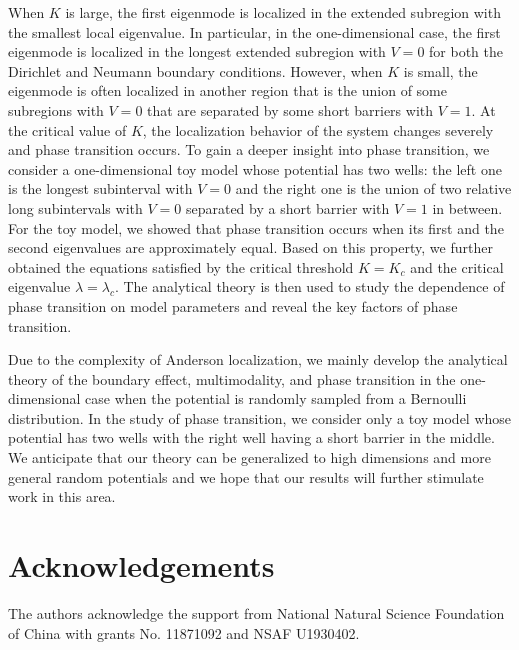 \documentclass[a4paper,11pt]{article}
\begin{document}
When $K$ is large, the first eigenmode is localized in the extended subregion with the smallest local eigenvalue. In particular, in the one-dimensional case, the first eigenmode is localized in the longest extended subregion with $V = 0$ for both the Dirichlet and Neumann boundary conditions. However, when $K$ is small, the eigenmode is often localized in another region that is the union of some subregions with $V = 0$ that are separated by some short barriers with $V = 1$. At the critical value of $K$, the localization behavior of the system changes severely and phase transition occurs. To gain a deeper insight into phase transition, we consider a one-dimensional toy model whose potential has two wells: the left one is the longest subinterval with $V = 0$ and the right one is the union of two relative long subintervals with $V = 0$ separated by a short barrier with $V = 1$ in between. For the toy model, we showed that phase transition occurs when its first and the second eigenvalues are approximately equal. Based on this property, we further obtained the equations satisfied by the critical threshold $K = K_c$ and the critical eigenvalue $\lambda = \lambda_c$. The analytical theory is then used to study the dependence of phase transition on model parameters and reveal the key factors of phase transition.

Due to the complexity of Anderson localization, we mainly develop the analytical theory of the boundary effect, multimodality, and phase transition in the one-dimensional case when the potential is randomly sampled from a Bernoulli distribution. In the study of phase transition, we consider only a toy model whose potential has two wells with the right well having a short barrier in the middle. We anticipate that our theory can be generalized to high dimensions and more general random potentials and we hope that our results will further stimulate work in this area.


\section*{Acknowledgements}
The authors acknowledge the support from National Natural Science Foundation of China with
grants No. 11871092 and NSAF U1930402.
\end{document}
